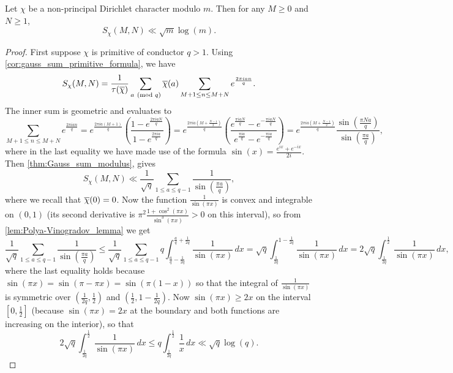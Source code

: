     \begin{theorem}
      Let $\chi$ be a non-principal Dirichlet character modulo $m$. Then for any $M \ge 0$ and $N \ge 1$,
      \[
        S_{\chi}(M,N) \ll \sqrt{m}\log(m).
      \]
    \end{theorem}
    \begin{proof}
      First suppose $\chi$ is primitive of conductor $q > 1$. Using \cref{cor:gauss_sum_primitive_formula}, we have
      \[
        S_{\chi}(M,N) = \frac{1}{\tau(\overline{\chi})}\sum_{a \ \left(\text{mod }q\right)}\overline{\chi}(a)\sum_{M+1 \le n \le M+N}e^{\frac{2\pi ian}{q}}.
      \]
      The inner sum is geometric and evaluates to
      \[
        \sum_{M+1 \le n \le M+N}e^{\frac{2\pi ian}{q}} = e^{\frac{2\pi ia(M+1)}{q}}\left(\frac{1-e^{\frac{2\pi iaN}{q}}}{1-e^{\frac{2\pi ia}{q}}}\right) = e^{\frac{2\pi ia\left(M+\frac{N-1}{2}\right)}{q}}\left(\frac{e^{\frac{\pi iaN}{q}}-e^{-\frac{\pi iaN}{q}}}{e^{\frac{\pi ia}{q}}-e^{-\frac{\pi ia}{q}}}\right) = e^{\frac{2\pi ia\left(M+\frac{N-1}{2}\right)}{q}}\frac{\sin\left(\frac{\pi Na}{q}\right)}{\sin\left(\frac{\pi a}{q}\right)},
      \]
      where in the last equality we have made use of the formula $\sin(x) = \frac{e^{ix}+e^{-ix}}{2i}$. Then \cref{thm:Gauss_sum_modulus}, gives
      \[
        S_{\chi}(M,N) \ll \frac{1}{\sqrt{q}}\sum_{1 \le a \le q-1}\frac{1}{\sin\left(\frac{\pi a}{q}\right)},
      \]
      where we recall that $\overline{\chi}(0) = 0$. Now the function $\frac{1}{\sin(\pi x)}$ is convex and integrable on $(0,1)$ (its second derivative is $\pi^{2}\frac{1+\cos^{2}(\pi x)}{\sin^{3}(\pi x)} > 0$ on this interval), so from \cref{lem:Polya-Vinogradov_lemma} we get
      \[
        \frac{1}{\sqrt{q}}\sum_{1 \le a \le q-1}\frac{1}{\sin\left(\frac{\pi a}{q}\right)} \le \frac{1}{\sqrt{q}}\sum_{1 \le a \le q-1}q\int_{\frac{a}{q}-\frac{1}{2q}}^{\frac{a}{q}+\frac{1}{2q}}\frac{1}{\sin(\pi x)}\,dx = \sqrt{q}\int_{\frac{1}{2q}}^{1-\frac{1}{2q}}\frac{1}{\sin(\pi x)}\,dx = 2\sqrt{q}\int_{\frac{1}{2q}}^{\frac{1}{2}}\frac{1}{\sin(\pi x)}\,dx,
      \]
      where the last equality holds because $\sin(\pi x) = \sin(\pi-\pi x) = \sin(\pi(1-x))$ so that the integral of $\frac{1}{\sin(\pi x)}$ is symmetric over $\left(\frac{1}{2q},\frac{1}{2}\right)$ and $\left(\frac{1}{2},1-\frac{1}{2q}\right)$. Now $\sin(\pi x) \ge 2x$ on the interval $[0,\frac{1}{2}]$ (because $\sin(\pi x) = 2x$ at the boundary and both functions are increasing on the interior), so that
      \[
        2\sqrt{q}\int_{\frac{1}{2q}}^{\frac{1}{2}}\frac{1}{\sin(\pi x)}\,dx \le q\int_{\frac{1}{2q}}^{\frac{1}{2}}\frac{1}{x}\,dx \ll \sqrt{q}\log(q).
\]
\end{proof}
